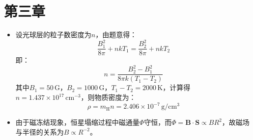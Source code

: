 \documentclass[a4paper,fontset=none]{ctexart}
\begin{document}
    \section*{第三章}

    \begin{itemize}

        \item[2.]
        设光球层的粒子数密度为$n$，由题意得：
        \[
        \frac{B_1^2}{8\pi} + nkT_1 = \frac{B_2^2}{8\pi} + nkT_2
        \]
        即：
        \[
        n = \frac{B_2^2 - B_1^2}{8\pi k(T_1 - T_2)}
        \]
        其中$B_1 = 50\,\mathrm{G}$，$B_2 = 1000\,\mathrm{G}$，$T_1 - T_2 = 2000\,\mathrm{K}$，计算得$n = 1.437\times10^{17}\,\mathrm{cm^{-3}}$，则物质密度为：
        \[
        \rho = m_{\mathrm{H}}n = 2.406\times10^{-7}\,\mathrm{g/cm^3}
        \]

        \item[3.]
        由于磁冻结现象，恒星塌缩过程中磁通量$\varPhi$守恒，而$\varPhi = \bm{B}\cdot\bm{S} \propto BR^2$，故磁场与半径的关系为$B \propto R^{-2}$。

    \end{itemize}
\end{document}

